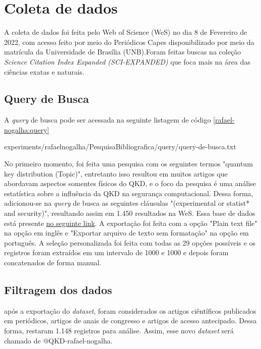 \section{Coleta de dados}

A coleta de dados foi feita pelo Web of Science (WeS) no dia 8 de Fevereiro de 2022, com acesso feito por meio do Periódicos Capes disponibilizado por meio da matrícula da Universidade de Brasília (UNB).Foram feitas buscas na coleção \textit{Science Citation Index Expanded (SCI-EXPANDED)} que foca mais na área das ciências exatas e naturais. 

\subsection{Query de Busca}

A \textit{query} de busca pode ser acessada na seguinte listagem de código \ref{rafael-nogalha:query}


{experiments/rafaelnogalha/PesquisaBibliografica/query/query-de-busca.txt}

No primeiro momento, foi feita uma pesquisa com os seguintes termos "quantum key distribution (Topic)", entretanto isso resultou em muitos artigos que abordavam aspectos somentes físicos do QKD, e o foco da pesquisa é uma análise estatística sobre a influência da QKD na segurança computacional. Dessa forma, adicionou-se na \textit{query} de busca as seguintes cláusulas "(experimental  or statist* and security)", resultando assim em 1.450 resultados na WeS. Essa base de dados está presente \href{https://github.com/jhcf/Comput-Experim-20212/tree/main/experiments/rafael-nogalha/PesquisaBibliografica/QKDSegurancaComputacional/dataset/dataset.txt}{no seguinte link}. A exportação foi feita com a opção "Plain text file" na opção em inglês e "Exportar arquivo de texto sem formatação" na opção em português. A seleção personalizada foi feita com todas as 29 opções possíveis e os registros foram extraídos em um intervalo de 1000 e 1000 e depois foram concatenados de forma manual.

\subsection{Filtragem dos dados}

após a exportação do \textit{dataset}, foram considerados os artigos ciêntíficos publicados em periódicos, artigos de anais de congresso e artigos de acesso antecipado. Dessa forma, restaram 1.148   registros para análise. Assim, esse novo \textit{dataset} será chamado de @QKD-rafael-nogalha.

